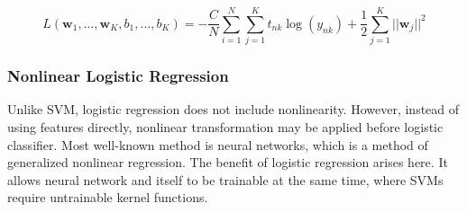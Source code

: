 \begin{equation}
\label{eq:regcrossentropy}
L(\boldsymbol{w}_1,\ldots,\boldsymbol{w}_K,b_1,\ldots,b_K) = -\frac{C}{N}\sum_{i=1}^{N}\sum_{j=1}^{K} t_{nk} \log(y_{nk}) + \frac{1}{2}\sum_{j=1}^{K} ||\boldsymbol{w}_j||^2
\end{equation} 

\subsubsection{Nonlinear Logistic Regression}

Unlike SVM, logistic regression does not include nonlinearity. However, instead of using features directly, nonlinear transformation may be applied before logistic classifier. Most well-known method is neural networks, which is a method of generalized nonlinear regression. The benefit of logistic regression arises here. It allows neural network and itself to be trainable at the same time, where SVMs require untrainable kernel functions.

